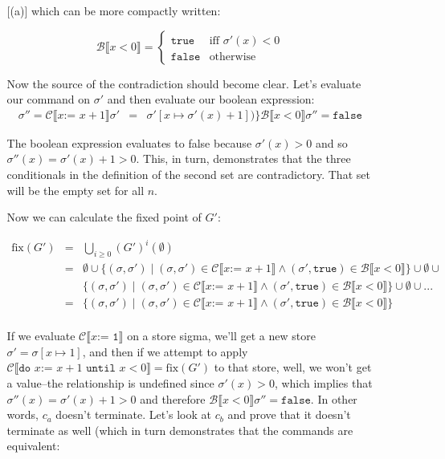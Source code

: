 \documentclass[10pt, oneside]{article}
\begin{document}
\begin{enumerate}[1.]
\begin{enumerate} [(a)]
			which can be more compactly written:
			
			$$\mathcal{B} \llbracket x < 0 \rrbracket = \left \{ 
			  \begin{array}{lr} 
			    \texttt{true}  & \text{iff } \sigma'(x) < 0 \\
			    \texttt{false} & \text{otherwise}
			  \end{array} \right.$$
			    
		  Now the source of the contradiction should become clear. Let's evaluate
		  our command on $\sigma'$ and then evaluate our boolean expression:
			\begin{eqnarray*}
			  \sigma'' = \mathcal{C} \llbracket x \texttt{:= } x + 1 \rrbracket \sigma' & = & \sigma'[x \mapsto \sigma'(x) + 1])\}
			  \mathcal{B} \llbracket x < 0 \rrbracket \sigma'' = \texttt{false}
			\end{eqnarray*}
			
			The boolean expression evaluates to false because $\sigma'(x) > 0$ and so 
			$\sigma''(x) = \sigma'(x) + 1 > 0$. This, in turn, demonstrates that the 
			three conditionals in the definition of the second set are contradictory. 
			That set will be the empty set for all $n$. \checkmark
			
			
			Now we can calculate the fixed point of $G'$:
			
			\begin{eqnarray*}
			  \text{fix}(G') & = & \bigcup_{i \geq 0} (G')^{i}(\emptyset) \\
			  & = & \emptyset \cup \{ (\sigma, \sigma') \mid (\sigma, \sigma') \in \mathcal{C} \llbracket x \texttt{:= } x + 1 \rrbracket \wedge (\sigma', \texttt{true}) \in \mathcal{B} \llbracket x < 0 \rrbracket \} \cup \emptyset \cup\\
			  & & \{ (\sigma, \sigma') \mid (\sigma, \sigma') \in \mathcal{C} \llbracket x \texttt{:= } x + 1 \rrbracket \wedge (\sigma', \texttt{true}) \in \mathcal{B} \llbracket x < 0 \rrbracket \} \cup \emptyset \cup ... \\
			  & = & \{ (\sigma, \sigma') \mid (\sigma, \sigma') \in \mathcal{C} \llbracket x \texttt{:= } x + 1 \rrbracket \wedge (\sigma', \texttt{true}) \in \mathcal{B} \llbracket x < 0 \rrbracket \} \\
			\end{eqnarray*}
			
			If we evaluate $\mathcal{C} \llbracket x \texttt{:= 1} \rrbracket$ on a store
			sigma, we'll get a new store $\sigma' = \sigma[x\mapsto 1]$, and then if we 
			attempt to apply  $\mathcal{C} \llbracket \texttt{do } x \texttt{:= } x + 1 
			\texttt{ until } x < 0 \rrbracket  =  \text{fix}(G')$ to that store, well, 
			we won't get a value--the relationship is undefined since $\sigma'(x) > 
			0$, which implies that $\sigma''(x) = \sigma'(x) + 1 > 0$ and therefore $
			\mathcal{B}\llbracket x < 0 \rrbracket \sigma'' = \texttt{false}$. In other 
			words, $c_a$ doesn't terminate. Let's look at $c_b$ and prove that it doesn't 
			terminate as well (which in turn demonstrates that the commands are 
			equivalent:
			

\end{enumerate}
\end{enumerate}
\end{document}

